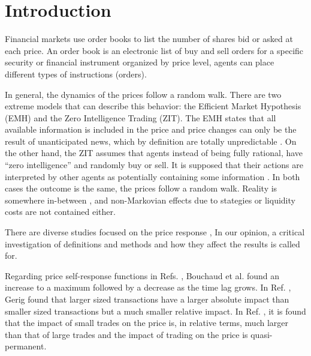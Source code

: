\section{Introduction}\label{sec:introduction}

Financial markets use order books to list the number of shares bid or asked at
each price. An order book is an electronic list of buy and sell orders for a
specific security or financial instrument organized by price level, agents can
place different types of instructions (orders).

In general, the dynamics of the prices follow a random walk. There are two
extreme models that can describe this behavior: the Efficient Market Hypothesis
(EMH) and the Zero Intelligence Trading (ZIT). The EMH states that all
available information is included in the price and price changes can only be
the result of unanticipated news, which by definition are totally unpredictable
\cite{subtle_nature,Bouchaud_2004,EMH_lillo,stat_theory}. On the other hand,
the ZIT assumes that agents instead of being fully rational, have ``zero
intelligence” and randomly buy or sell. It is supposed that their actions are
interpreted by other agents as potentially containing some information
\cite{subtle_nature,Bouchaud_2004,stat_theory,Wang_2016_cross}.
In both cases the outcome is the same, the prices follow a random walk. Reality
is somewhere in-between \cite{Bouchaud_2004,stat_theory}, and non-Markovian
effects due to stategies or liquidity costs are not contained either.

There are diverse studies focused on the price response
\cite{prop_order_book,dissecting_cross,r_walks_liquidity,subtle_nature,Bouchaud_2004,large_prices_changes,pow_law_dist,theory_market_impact,spread_changes_affect,master_curve,EMH_lillo,quant_stock_price_response,ori_pow_law,Wang_2018_b,Wang_2018_a,Wang_2016_avg,Wang_2016_cross},
In our opinion, a critical investigation of definitions and methods and how
they affect the results is called for.

Regarding price self-response functions in Refs.
\cite{r_walks_liquidity,subtle_nature,Bouchaud_2004}, Bouchaud et al. found an
increase to a maximum followed by a decrease as the time lag grows.
In Ref. \cite{theory_market_impact}, Gerig found that larger sized transactions
have a larger absolute impact than smaller sized transactions but a much
smaller relative impact. In Ref. \cite{prop_order_book}, it is found that the
impact of small trades on the price is, in relative terms, much larger than
that of large trades and the impact of trading on the price is quasi-permanent.

